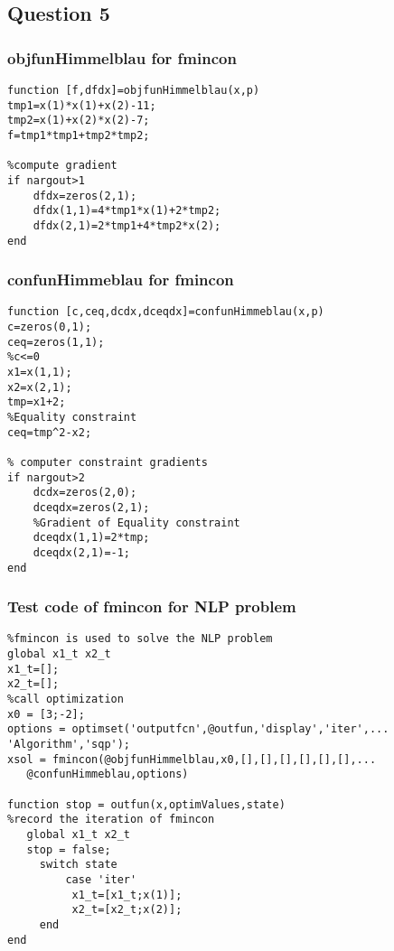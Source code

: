 \subsection{\bfseries Question 5 }
\subsubsection{\bfseries objfunHimmelblau for fmincon}
\label{6.5.1}
{\setmainfont{Courier New Bold} \scriptsize         
\begin{lstlisting}
function [f,dfdx]=objfunHimmelblau(x,p)
tmp1=x(1)*x(1)+x(2)-11;
tmp2=x(1)+x(2)*x(2)-7;
f=tmp1*tmp1+tmp2*tmp2;

%compute gradient
if nargout>1
    dfdx=zeros(2,1);
    dfdx(1,1)=4*tmp1*x(1)+2*tmp2;
    dfdx(2,1)=2*tmp1+4*tmp2*x(2);
end
\end{lstlisting}}
\subsubsection{\bfseries confunHimmeblau for fmincon}
\label{6.5.2}
{\setmainfont{Courier New Bold} \scriptsize         
\begin{lstlisting}
function [c,ceq,dcdx,dceqdx]=confunHimmeblau(x,p)
c=zeros(0,1);
ceq=zeros(1,1);
%c<=0  
x1=x(1,1);
x2=x(2,1);
tmp=x1+2;
%Equality constraint 
ceq=tmp^2-x2;

% computer constraint gradients
if nargout>2
    dcdx=zeros(2,0);
    dceqdx=zeros(2,1);
    %Gradient of Equality constraint
    dceqdx(1,1)=2*tmp;
    dceqdx(2,1)=-1;
end
\end{lstlisting}}

\subsubsection{\bfseries Test code of fmincon for NLP problem}
\label{6.5.3}
{\setmainfont{Courier New Bold} \scriptsize         
\begin{lstlisting}
%fmincon is used to solve the NLP problem
global x1_t x2_t
x1_t=[];
x2_t=[];
%call optimization
x0 = [3;-2];
options = optimset('outputfcn',@outfun,'display','iter',...
'Algorithm','sqp');
xsol = fmincon(@objfunHimmelblau,x0,[],[],[],[],[],[],...
   @confunHimmeblau,options)

function stop = outfun(x,optimValues,state) 
%record the iteration of fmincon
   global x1_t x2_t
   stop = false;
     switch state
         case 'iter'
          x1_t=[x1_t;x(1)];
          x2_t=[x2_t;x(2)];
     end   
end

\end{lstlisting}}

